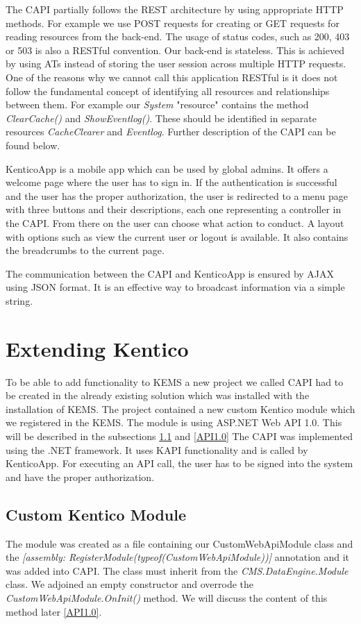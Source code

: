 The CAPI partially follows the REST architecture by using appropriate HTTP methods. For example we use POST requests for creating or GET requests for reading resources from the back-end. The usage of status codes, such as 200, 403 or 503 is also a RESTful convention. Our back-end is stateless. This is achieved by using ATs instead of storing the user session across multiple HTTP requests. One of the reasons why we cannot call this application RESTful is it does not follow the fundamental concept of identifying all resources and relationships between them. For example our \textit{System} "resource" contains the method \textit{ClearCache()} and \textit{ShowEventlog()}. These should be identified in separate resources \textit{CacheClearer} and \textit{Eventlog}. Further description of the CAPI can be found below.

KenticoApp is a mobile app which can be used by global admins. It offers a welcome page where the user has to sign in. If the authentication is successful and the user has the proper authorization, the user is redirected to a menu page with three buttons and their descriptions, each one representing a controller in the CAPI. From there on the user can choose what action to conduct. A layout with options such as view the current user or logout is available. It also contains the breadcrumbs to the current page. 

The communication between the CAPI and KenticoApp is ensured by AJAX using JSON format. It is an effective way to broadcast information via a simple string.

\section{Extending Kentico} \label{implExtendingKentico}
To be able to add functionality to KEMS a new project we called CAPI had to be created in the already existing solution which was installed with the installation of KEMS. The project contained a new  custom Kentico module which we registered in the KEMS. The module is using ASP.NET Web API 1.0. This will be described in the subsections \ref{cutomModule} and \ref{API1.0}
The CAPI was implemented using the .NET framework. It uses KAPI functionality and is called by KenticoApp. For executing an API call, the user has to be signed into the system and have the proper authorization. 
\subsection{Custom Kentico Module} \label{cutomModule}
The module was created as a file containing our CustomWebApiModule class and the \textit{[assembly: RegisterModule(typeof(CustomWebApiModule))]} annotation and it was added into CAPI. The class must inherit from the \textit{CMS.DataEngine.Module} class. We adjoined an empty constructor and overrode the \textit{CustomWebApiModule.OnInit()} method. We will discuss the content of this method later \ref{API1.0}. 
